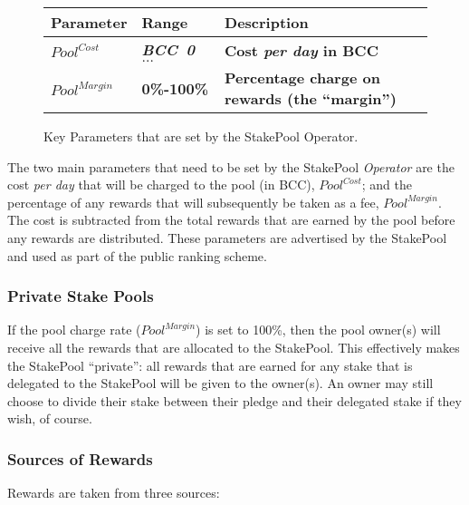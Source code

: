 \documentclass[11pt,a4paper,dvipsnames,twosided,final]{article}
\newcommand{\bcc}{BCC{}}
\newcommand{\BCC}[1]{\textbf{\emph{\bcc~{#1}}}}
\newcommand{\bcc}[1]{Bcc}
\begin{document}
\begin{figure}[h!]
\begin{center}
\begin{tabular}{||l|l|p{9cm}||}
  \hline \hline
\textbf{Parameter} & \textbf{Range} & \textbf{Description} \\\hline
       \textbf{\color{red} $\textit{Pool}^{\textit{Cost}}$} &  \textbf{\color{red}  \BCC{0} $\ldots$} & \textbf{\color{red} Cost
         \emph{per day} in \bcc{}} \\\hline
\textbf{\color{red} ${\textit{Pool}}^{\textit{Margin}}$} &  \textbf{\color{red} 0\%-100\%} & \textbf{\color{red} Percentage charge on rewards (the ``margin'')} \\\hline
  \hline
\end{tabular}
\end{center}
\caption{Key Parameters that are set by the StakePool Operator.}
\end{figure}

\noindent
The two main parameters that need to be set by the StakePool \emph{Operator} are the cost \emph{per day} that will be charged to
the pool (in \bcc), $\textit{Pool}^{\textit{Cost}}$; and the percentage of any rewards that will subsequently be taken as a fee, ${\textit{Pool}}^{\textit{Margin}}$.
The cost is subtracted from the total rewards that are earned by the pool before any rewards are distributed.
These parameters are advertised by the StakePool and used as part of the public ranking scheme.

\subsubsection*{Private Stake Pools}

If the pool charge rate (${\textit{Pool}}^{\textit{Margin}}$) is set to 100\%, then the pool owner(s) will receive
all the rewards that are allocated to the StakePool.  This effectively makes the StakePool ``private'':
all rewards that are earned for any stake that is delegated to the StakePool will be given to the owner(s).
An owner may still choose to divide their stake between their pledge and their delegated stake if they wish, of course.

\subsubsection*{Sources of Rewards}

Rewards are taken from three sources:
\end{document}
